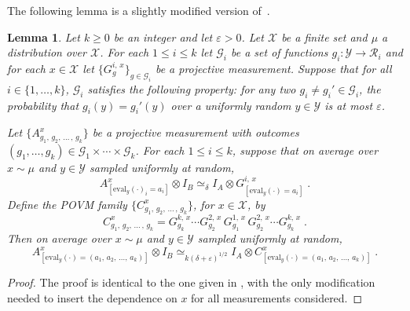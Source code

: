 \documentclass{book}
\theoremstyle{plain}
\newtheorem{lemma}[subsection]{Lemma}
\theoremstyle{definition}
\theoremstyle{remark}
\numberwithin{equation}{subsection}
\newcommand{\eps}{\varepsilon}
\newcommand{\mX}{\mathcal{X}}
\newcommand{\mY}{\mathcal{Y}}
\newcommand{\mR}{\mathcal{R}}
\newcommand{\mG}{\mathcal{G}}
\newcommand{\eval}{\mathrm{eval}}
\newcommand{\alice}{A}
\newcommand{\bob}{B}
\newcommand{\abc}[1][\delta]{\otimes I_\bob \simeq_{#1} I_\alice \otimes}
\begin{document}
The following lemma is a slightly modified version of~\cite[Fact~4.34]{NW19}.
\begin{lemma}\label{lem:ld-sandwich}
  Let $k \geq 0$ be an integer and let $\eps>0$.
  Let $\mX$ be a finite set and $\mu$ a distribution over $\mX$.
  For each $1 \leq i \leq k$ let $\mG_i$ be a set of functions $g_i : \mY
  \rightarrow \mR_i$ and for each $x \in \mX$ let $\{G^{i,\, x}_g\}_{g\in
    \mG_i}$ be a projective measurement.
  Suppose that for all $i\in \{1,\ldots,k\}$, $\mG_i$ satisfies the following
  property: for any two $g_i \neq g_i' \in \mG_i$, the probability that $g_i(y)
  = g_i'(y)$ over a uniformly random $y \in \mY$ is at most $\eps$.

  Let $\bigl\{ A^{x}_{g_1,\, g_2,\, \ldots\,,\, g_k} \bigr\}$ be a projective
  measurement with outcomes $(g_1,\ldots,g_k) \in \mG_1\times\cdots\times
  \mG_k$.
  For each $1 \leq i \leq k$, suppose that on average over $x \sim \mu$ and
  $y\in \mY$ sampled uniformly at random,
  \begin{equation}\label{eq:ld-sandwich-1}
    A^{x}_{[\eval_y(\cdot)_i = a_i]} \abc G^{i,\, x}_{[\eval_y(\cdot)=a_i]}\;.
  \end{equation}
  Define the POVM family $\{C^x_{g_1,\, g_2,\, \ldots\,,\, g_k}\}$, for $x\in \mX$, by
  \begin{equation*}
    C^x_{g_1,\, g_2,\, \ldots\,,\, g_k} = G^{k,\, x}_{g_k} \cdots
    G^{2,\, x}_{g_2} \, G^{1,\, x}_{g_1} \, G^{2,\, x}_{g_2} \cdots
    G^{k,\, x}_{g_k}\;.
  \end{equation*}
  Then on average over $x\sim \mu$ and $y\in \mY$ sampled uniformly at random,
  \begin{equation}\label{eq:ld-sandwich-2}
    A^x_{[\eval_y(\cdot) = (a_1,\, a_2,\, \ldots,\, a_k)]} \abc[k(\delta+\eps)^{1/2}]
    C^x_{[\eval_y(\cdot) = (a_1,\, a_2,\, \ldots,\, a_k)]}\;.
\end{equation}
\end{lemma}

\begin{proof}
  The proof is identical to the one given in \cite[Fact~4.34]{NW19}, with the
  only modification needed to insert the dependence on $x$ for all measurements
  considered.
\end{proof}
\end{document}
